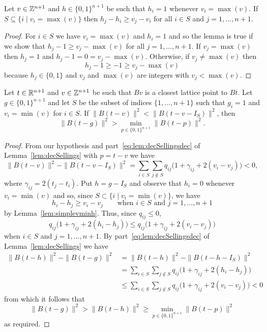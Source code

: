 \documentclass[final,leqno]{siamltex}
\begin{document}
\begin{lemma}\label{lem:simplevmaxh}
Let $v \in {\mathbb Z}^{n+1}$ and $h \in \{0,1\}^{n+1}$ be such that $h_i = 1$ whenever $v_i = \max(v)$.  If $S \subseteq \{ i \mid v_i = \max(v) \}$ then $h_j - h_i \geq v_j - v_i$ for all $i \in S$ and $j = 1,\dots,n+1$.
\end{lemma}
\begin{proof}
For $i \in S$ we have $v_i = \max(v)$ and $h_i = 1$ and so the lemma is true if we show that $h_j-1 \geq v_j - \max(v)$ for all $j=1,\dots,n+1$.  If $v_j = \max(v)$ then $h_j = 1$ and $h_j-1 = 0 = v_j - \max(v)$.  Otherwise, if $v_j \neq \max(v)$ then 
\[
h_j-1 \geq -1 \geq v_j - \max(v)
\] 
because $h_j \in \{0,1\}$ and $v_j$ and $\max(v)$ are integers with $v_j < \max(v)$.
\end{proof}


\begin{lemma}\label{lem:vqcontramin}
Let $t \in {\mathbb R}^{n+1}$ and $v \in {\mathbb Z}^{n+1}$ be such that $Bv$ is a closest lattice point to $Bt$.  Let $g \in \{0,1\}^{n+1}$ and let $S$ be the subset of indices $\{1,\dots,n+1\}$ such that $g_i=1$ and $v_i = \min(v)$ for $i \in S$.  If $\|B(t-v)\|^2 < \|B(t-v-I_S)\|^2$, then
\[
\|B(t - g)\|^2 > \min_{p \in \{0,1\}^{n+1}}\|B(t - p)\|^2.
\]
\end{lemma}
\begin{proof}
From our hypothesis and part~\ref{eq:lem:decSellingsdec} of Lemma~\ref{lem:decSellings} with $p = t-v$ we have
\[
\|B(t-v)\|^2 - \|B(t-v-I_S)\|^2 = \sum_{i \in S}\sum_{j \notin S}q_{ij}\big(1 + \gamma_{ij} + 2(v_i - v_j)\big) < 0, 
\]
where $\gamma_{ij} = 2(t_j - t_i)$.  Put $h = g - I_S$ and observe that $h_i = 0$ whenever $v_i = \min(v)$ and so, since $S \subset \{i \mid v_i = \min(v) \}$, we have
\[
h_i - h_j \geq v_i - v_j \qquad \text{when $i \in S$ and $j=1,\dots,n+1$}
\]
by Lemma~\ref{lem:simplevminh}.  Thus, since $q_{ij} \leq 0$,
\[
q_{ij}\big(1 + \gamma_{ij} + 2(h_i - h_j)\big) \leq q_{ij}\big(1 + \gamma_{ij} + 2(v_i - v_j)\big)
\]
when $i \in S$ and $j =1,\dots,n+1$.  By part~\ref{eq:lem:decSellingsdec} of Lemma~\ref{lem:decSellings} we have
\begin{align*}
\|B(t-h)\|^2 - \|B(t-g)\|^2 &= \|B(t-h)\|^2 - \|B(t-h-I_S)\|^2 \\
&= \sum_{i \in S}\sum_{j \notin S}q_{ij}\big(1 + \gamma_{ij} + 2(h_i - h_j)\big) \\
&\leq \sum_{i \in S}\sum_{j \notin S}q_{ij}\big(1 + \gamma_{ij} + 2(v_i - v_j)\big) < 0
\end{align*}
from which it follows that
\[
\|B(t-g)\|^2 > \|B(t-h)\|^2 \geq \min_{p \in \{0,1\}^{n+1}}\|B(t  - p)\|^2
\]
as required.
\end{proof}
\end{document}

